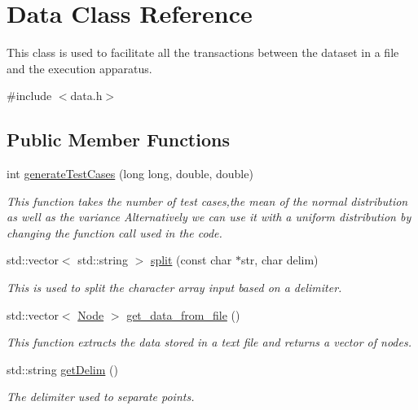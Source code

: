 \hypertarget{classData}{}\section{Data Class Reference}
\label{classData}


This class is used to facilitate all the transactions between the dataset in a file and the execution apparatus.  




{\ttfamily \#include $<$data.\+h$>$}

\subsection*{Public Member Functions}
\begin{DoxyCompactItemize}
\item 
int \hyperlink{classData_a5232e86a00b695f2829b8f577a3f9fc1}{generate\+Test\+Cases} (long long, double, double)
\begin{DoxyCompactList}\small\item\em This function takes the number of test cases,the mean of the normal distribution as well as the variance Alternatively we can use it with a uniform distribution by changing the function call used in the code. \end{DoxyCompactList}\item 
std\+::vector$<$ std\+::string $>$ \hyperlink{classData_aa8feaee3333daf2ac31c31e171777532}{split} (const char $\ast$str, char delim)
\begin{DoxyCompactList}\small\item\em This is used to split the character array input based on a delimiter. \end{DoxyCompactList}\item 
std\+::vector$<$ \hyperlink{classNode}{Node} $>$ \hyperlink{classData_aaa0edf3d2ab62aa1a10abed1ba8d89ca}{get\+\_\+data\+\_\+from\+\_\+file} ()
\begin{DoxyCompactList}\small\item\em This function extracts the data stored in a text file and returns a vector of nodes. \end{DoxyCompactList}\item 
std\+::string \hyperlink{classData_afe8507d0c66eed659e966605058eb6c4}{get\+Delim} ()
\begin{DoxyCompactList}\small\item\em The delimiter used to separate points. \end{DoxyCompactList}\item 

\end{DoxyCompactItemize}
